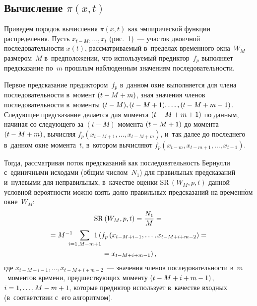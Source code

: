 \begin{multicols}{2}
  
\section{Вычисление $\pi (x, t)$}


  Приведем порядок вычисления $\pi (x, t)$ как эмпирической функции 
распределения. Пусть $x_{t-M}, \ldots , x_t$ (рис.~1)~--- участок двоичной 
последовательности $x(t)$, рассматриваемый в~пределах временного 
окна~$W_M$ размером~$M$ в~предположении, что используемый 
предиктор~$f_p$ выполняет предсказание по~$m$ прошлым наблюденным 
значениям последовательности.
  
 
  Первое предсказание предиктором~$f_p$ в~данном окне выполняется для 
члена последовательности в~момент $(t\hm- M \hm+ m)$, зная значения 
членов последовательности в~моменты $(t- M), (t - M + 1), \ldots , (t\hm- M \hm+ m \hm-
1)$. Следующее предсказание делается для момента $(t \hm-
 M \hm+ m \hm+ 1)$ по данным, начиная со следующего за $(t - M)$ момента 
$(t\hm- M \hm+ 1)$ до момента $(t\hm- M \hm+ m)$, вычисляя $f_p(x_{t-M+1}, 
\ldots , x_{t-M+m})$, и~так далее до последнего в~данном окне момента~$t$, 
в~котором вычисляют $f_p(x_{t-m}, x_{t-m+1},\ldots , x_{t-1})$.
   
  Тогда, рассматривая поток предсказаний как последовательность Бернулли 
с~единичными исходами (общим числом~$N_1$) для правильных 
предсказаний и~нулевыми для неправильных, в~качестве оценки 
$\mathrm{SR}\,(W_M, p, t)$ данной условной ве\-ро\-ят\-ности можно взять долю 
правильных предсказаний на временн$\acute{\mbox{о}}$м окне~$W_M$: 
  \begin{multline*}
\mathrm{SR}\,(W_M, p, t) = \fr{N_1}{M} ={}\\
{}= M^{-1}\hspace*{-8pt}\sum\limits_{i=1,M-m+1} \hspace*{-11.8348pt}1 
\left( f_p\left ( x_{t-M+i-1}, \ldots , x_{t-M+i+m-2} \right) ={}\right.\\
\left.{}= x_{t-M+i+m-1}\right),
\end{multline*}
где $x_{t-M+i-1}, \ldots , x_{t-M+i+m-2}$~--- значения членов последовательности 
в~$m$~моментов времени, предшествующих моменту $(t\hm-
 M \hm+ i \hm+ m\hm-1)$, $i\hm = 1, \ldots , M-m+1$, которые предиктор 
использует в~качестве входных (в~соответствии с~его алгоритмом).
  

\end{multicols}
